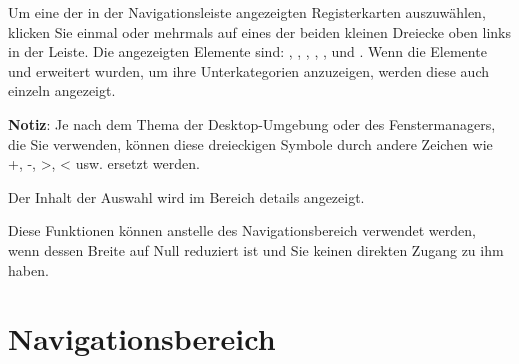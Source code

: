 
Um eine der in der Navigationsleiste angezeigten Registerkarten auszuwählen, klicken Sie einmal oder mehrmals auf eines der beiden kleinen Dreiecke oben links in der Leiste.  Die angezeigten Elemente sind: , , , , ,  und .  Wenn die Elemente  und  erweitert wurden, um ihre Unterkategorien anzuzeigen, werden diese auch einzeln angezeigt.%


\textbf{Notiz}: Je nach dem Thema der Desktop-Umgebung oder des Fenstermanagers, die Sie verwenden, können diese dreieckigen Symbole durch andere Zeichen wie +, -, >, < usw. ersetzt werden.%

Der Inhalt der Auswahl wird im Bereich details angezeigt.%

Diese Funktionen können anstelle des Navigationsbereich verwendet werden, wenn dessen Breite auf Null reduziert ist und Sie keinen direkten Zugang zu ihm haben.%


\section{Navigationsbereich\label{home-accounting}}

